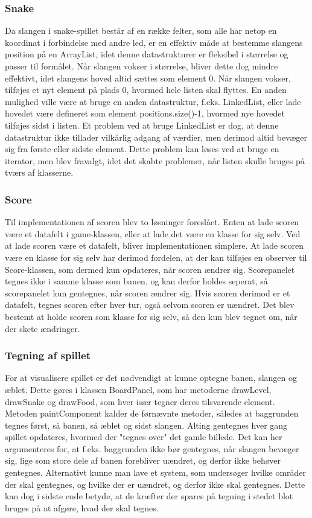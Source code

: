\subsubsection{Snake}
Da slangen i snake-spillet består af en række felter, som alle har netop en koordinat i forbindelse med andre led, er en effektiv måde at bestemme slangens position på en ArrayList, idet denne datastrukturer er fleksibel i størrelse og passer til formålet. Når slangen vokser i størrelse, bliver dette dog mindre effektivt, idet slangens hoved altid sættes som element 0. Når slangen vokser, tilføjes et nyt element på plads 0, hvormed hele listen skal flyttes. En anden mulighed ville være at bruge en anden datastruktur, f.eks. LinkedList, eller lade hovedet være defineret som element positions.size()-1, hvormed nye hovedet tilføjes sidst i listen. Et problem ved at bruge LinkedList er dog, at denne datastruktur ikke tillader vilkårlig adgang af værdier, men derimod altid bevæger sig fra første eller sidste element. Dette problem kan løses ved at bruge en iterator, men blev fravalgt, idet det skabte problemer, når listen skulle bruges på tværs af klasserne.

\subsubsection{Score}
Til implementationen af scoren blev to løsninger foreslået. Enten at lade scoren være et datafelt i game-klassen, eller at lade det være en klasse for sig selv. Ved at lade scoren være et datafelt, bliver implementationen simplere. At lade scoren være en klasse for sig selv har derimod fordelen, at der kan tilføjes en observer til Score-klassen, som dermed kun opdateres, når scoren ændrer sig. Scorepanelet tegnes ikke i samme klasse som banen, og kan derfor holdes seperat, så scorepanelet kun gentegnes, når scoren ændrer sig. Hvis scoren derimod er et datafelt, tegnes scoren efter hver tur, også selvom scoren er uændret. Det blev bestemt at holde scoren som klasse for sig selv, så den kun blev tegnet om, når der skete ændringer. 

\subsubsection{Tegning af spillet}
For at visualisere spillet er det nødvendigt at kunne optegne banen, slangen og æblet. Dette gøres i klassen BoardPanel, som har metoderne drawLevel, drawSnake og drawFood, som hver især tegner deres tilsvarende element. Metoden paintComponent kalder de førnævnte metoder, således at baggrunden tegnes først, så banen, så æblet og sidst slangen. Alting gentegnes hver gang spillet opdateres, hvormed der "tegnes over" det gamle billede. Det kan her argumenteres for, at f.eks. baggrunden ikke bør gentegnes, når slangen bevæger sig, lige som store dele af banen forebliver uændret, og derfor ikke behøver gentegnes. Alternativt kunne man lave et system, som undersøger hvilke områder der skal gentegnes, og hvilke der er uændret, og derfor ikke skal gentegnes. Dette kan dog i sidste ende betyde, at de kræfter der spares på tegning i stedet blot bruges på at afgøre, hvad der skal tegnes.

